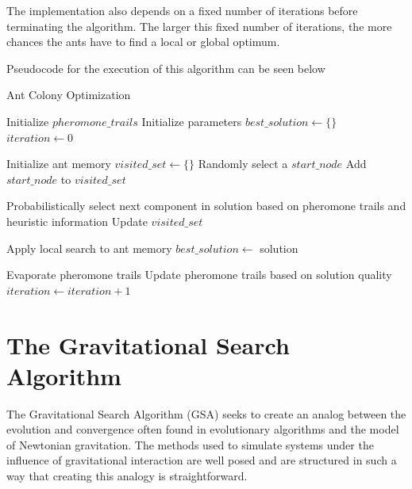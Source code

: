 \documentclass{article}
\begin{document}
The implementation also depends on a fixed number of iterations before terminating the algorithm. The larger this fixed number of iterations, the more chances the ants have to find a local or global optimum.

Pseudocode for the execution of this algorithm can be seen below
\begin{algorithm}[!h]
    \DontPrintSemicolon
    \caption{Ant Colony Optimization}
    \label{alg:aco}
    \KwResult{}

    Initialize $pheromone\_trails$\;
    Initialize parameters\;
    $best\_solution\gets\{\}$\;
    $iteration\gets0$\;
    {
        {
            Initialize ant memory\;
            $visited\_set\gets\{\}$\;
            Randomly select a $start\_node$\;
            Add $start\_node$ to $visited\_set$\;

            {
                Probabilistically select next component in solution based on pheromone trails and heuristic information\;
                Update $visited\_set$\;
            }
        
            Apply local search to ant memory\;
            {
                $best\_solution\gets$ solution\;
            }
        }
        Evaporate pheromone trails\;
        Update pheromone trails based on solution quality\;
        $iteration\gets iteration + 1$
    }
    
\end{algorithm}
\newpage

\section*{The Gravitational Search Algorithm}

            The Gravitational Search Algorithm (GSA) seeks to create an analog between the evolution and convergence often found in evolutionary algorithms and the model of Newtonian gravitation.  The methods used to simulate systems under the influence of gravitational interaction are well posed and are structured in such a way that creating this analogy is straightforward.
            
\end{document}
